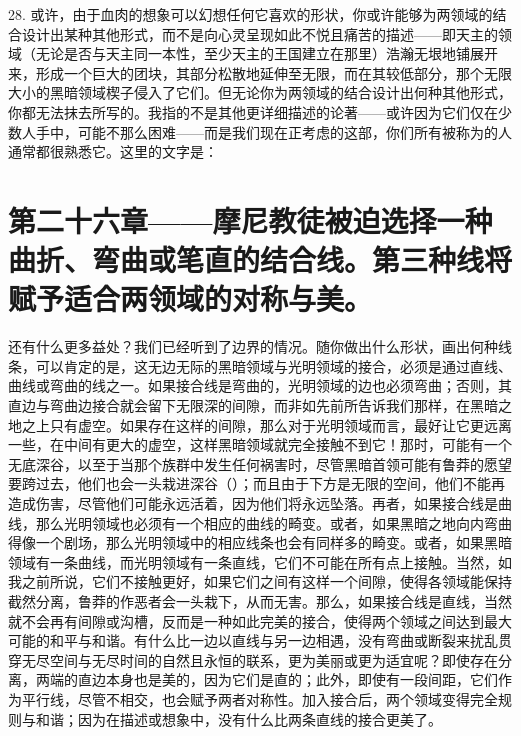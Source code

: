 28. 或许，由于血肉的想象可以幻想任何它喜欢的形状，你或许能够为两领域的结合设计出某种其他形式，而不是向心灵呈现如此不悦且痛苦的描述——即天主的领域（无论是否与天主同一本性，至少天主的王国建立在那里）浩瀚无垠地铺展开来，形成一个巨大的团块，其部分松散地延伸至无限，而在其较低部分，那个无限大小的黑暗领域楔子侵入了它们。但无论你为两领域的结合设计出何种其他形式，你都无法抹去所写的。我指的不是其他更详细描述的论著——或许因为它们仅在少数人手中，可能不那么困难——而是我们现在正考虑的这部，你们所有被称为的人通常都很熟悉它。这里的文字是：\par


\section{第二十六章——摩尼教徒被迫选择一种曲折、弯曲或笔直的结合线。第三种线将赋予适合两领域的对称与美。}

还有什么更多益处？我们已经听到了边界的情况。随你做出什么形状，画出何种线条，可以肯定的是，这无边无际的黑暗领域与光明领域的接合，必须是通过直线、曲线或弯曲的线之一。如果接合线是弯曲的，光明领域的边也必须弯曲；否则，其直边与弯曲边接合就会留下无限深的间隙，而非如先前所告诉我们那样，在黑暗之地之上只有虚空。如果存在这样的间隙，那么对于光明领域而言，最好让它更远离一些，在中间有更大的虚空，这样黑暗领域就完全接触不到它！那时，可能有一个无底深谷，以至于当那个族群中发生任何祸害时，尽管黑暗首领可能有鲁莽的愿望要跨过去，他们也会一头栽进深谷（）；而且由于下方是无限的空间，他们不能再造成伤害，尽管他们可能永远活着，因为他们将永远坠落。再者，如果接合线是曲线，那么光明领域也必须有一个相应的曲线的畸变。或者，如果黑暗之地向内弯曲得像一个剧场，那么光明领域中的相应线条也会有同样多的畸变。或者，如果黑暗领域有一条曲线，而光明领域有一条直线，它们不可能在所有点上接触。当然，如我之前所说，它们不接触更好，如果它们之间有这样一个间隙，使得各领域能保持截然分离，鲁莽的作恶者会一头栽下，从而无害。那么，如果接合线是直线，当然就不会再有间隙或沟槽，反而是一种如此完美的接合，使得两个领域之间达到最大可能的和平与和谐。有什么比一边以直线与另一边相遇，没有弯曲或断裂来扰乱贯穿无尽空间与无尽时间的自然且永恒的联系，更为美丽或更为适宜呢？即使存在分离，两端的直边本身也是美的，因为它们是直的；此外，即使有一段间距，它们作为平行线，尽管不相交，也会赋予两者对称性。加入接合后，两个领域变得完全规则与和谐；因为在描述或想象中，没有什么比两条直线的接合更美了。\par

